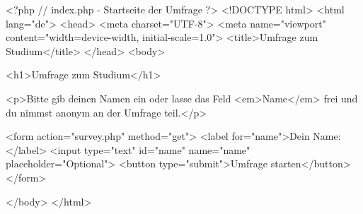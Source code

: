 <?php
// index.php - Startseite der Umfrage
?>
<!DOCTYPE html>
<html lang="de">
<head>
    <meta charset="UTF-8">
    <meta name="viewport" content="width=device-width, initial-scale=1.0">
    <title>Umfrage zum Studium</title>
</head>
<body>

    <h1>Umfrage zum Studium</h1>
    
    <p>Bitte gib deinen Namen ein oder lasse das Feld <em>Name</em> frei und du nimmst anonym an der Umfrage teil.</p>
    
    <form action="survey.php" method="get">
        <label for="name">Dein Name:</label>
        <input type="text" id="name" name="name" placeholder="Optional">
        <button type="submit">Umfrage starten</button>
    </form>

</body>
</html>